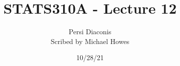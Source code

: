 




\title{STATS310A - Lecture 12}
\author{Persi Diaconis\\ Scribed by Michael Howes}
\date{10/28/21}

\pagestyle{fancy}
\fancyhf{}


\maketitle
\tableofcontents
